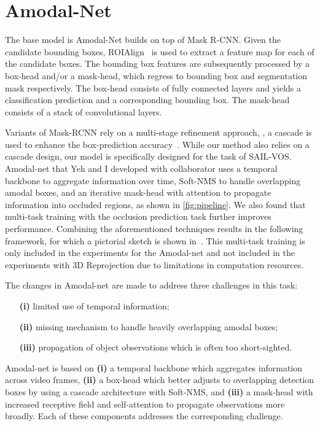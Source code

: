 \section{Amodal-Net}
The base model is Amodal-Net builds on top of Mask R-CNN\cite{he2017mask}. Given the candidate bounding boxes, ROIAlign~\cite{he2017mask} is used to extract a feature map for each of the candidate boxes. The bounding box features are subsequently processed by a box-head and/or a mask-head, which regress to bounding box and segmentation mask respectively. The box-head consists of fully connected layers and yields a classification prediction and a  corresponding bounding box.  %
The mask-head consists of a stack of convolutional layers. 

Variants of Mask-RCNN rely on a multi-stage refinement approach, \ie, a cascade is used to enhance the box-prediction accuracy~\cite{cai2018cascade, chen2019hybrid}. While our method also relies on a cascade design, our model is specifically designed for the task of SAIL-VOS. Amodal-net that Yeh and I developed with collaborator uses a temporal backbone to aggregate information over time, Soft-NMS to handle overlapping amodal boxes, and an iterative mask-head with attention to propagate information into occluded regions, as shown in \ref{fig:pipeline}. We also found that multi-task training with the occlusion prediction task further improves performance. Combining the aforementioned techniques results in the following framework, for which a pictorial sketch is shown in~. This multi-task training is only included in the experiments for the Amodal-net and not included in the experiments with 3D Reprojection due to limitations in computation resources.

The changes in Amodal-net are made to address three challenges in this task: 
\begin{enumerate}
    \item[\bf (i)] limited use of temporal information;
    \item[\bf (ii)] missing mechanism to handle heavily overlapping amodal boxes; 
    \item[\bf (iii)] propagation of object observations which is often too short-sighted. 
\end{enumerate}

Amodal-net is based on {\bf (i)} a temporal backbone which aggregates information across video frames, {\bf (ii)} a box-head which 
better adjusts to overlapping detection boxes by using a cascade architecture with  Soft-NMS, 
and {\bf (iii)} a mask-head with increased receptive field and self-attention to propagate observations more broadly. Each of these components addresses the corresponding  challenge. 

